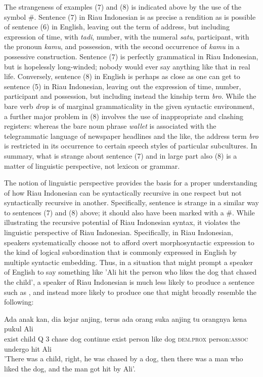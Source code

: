 \documentclass[output=paper,colorlinks,citecolor=brown
]{langscibook}
\begin{document}
The strangeness of examples (7) and (8) is indicated above by the use of the symbol \#.  Sentence (7) in Riau Indonesian is as precise a rendition as is possible of sentence (6) in English, leaving out the term of address, but including expression of time, with \emph{tadi}, number, with the numeral \emph{satu}, participant, with the pronoun \emph{kamu}, and possession, with the second occurrence of \emph{kamu} in a possessive construction.  Sentence (7) is perfectly grammatical in Riau Indonesian, but is hopelessly long-winded; nobody would ever say anything like that in real life.  Conversely, sentence (8) in English is perhaps as close as one can get to sentence (5) in Riau Indonesian, leaving out the expression of time, number, participant and possession, but including instead the kinship term \emph{bro}.  While the bare verb \emph{drop} is of marginal grammaticality in the given syntactic environment, a further major problem in (8) involves the use of inappropriate and clashing registers: whereas the bare noun phrase \emph{wallet} is associated with the telegrammatic language of newspaper headlines and the like, the address term \emph{bro} is restricted in its occurrence to certain speech styles of particular subcultures.  In summary, what is strange about sentence (7) and in large part also (8) is a matter of linguistic perspective, not lexicon or grammar.

The notion of linguistic perspective provides the basis for a proper understanding of how Riau Indonesian can be syntactically recursive in one respect but not syntactically recursive in another.  Specifically, sentence  is strange in a similar way to sentences (7) and (8) above; it should also have been marked with a \#.  While illustrating the recursive potential of Riau Indonesian syntax, it violates the linguistic perspective of Riau Indonesian.  Specifically, in Riau Indonesian, speakers systematically choose not to afford overt morphosyntactic expression to the kind of logical subordination that is commonly expressed in English by multiple syntactic embedding.  Thus, in a situation that might prompt a speaker of English to say something like 'Ali hit the person who likes the dog that chased the child', a speaker of Riau Indonesian is much less likely to produce a sentence such as , and instead more likely to produce one that might broadly resemble the following:

\ea
\gll Ada	anak	kan,	dia	kejar	anjing,	terus	ada	orang	suka	anjing	tu orangnya	kena	pukul	Ali \\
    exist	child	Q	3	chase	dog	continue	exist	person	like	dog \textsc{dem.prox} person:\textsc{assoc}	undergo	hit	Ali\\
\glt 		'There was a child, right, he was chased by a dog, then there was a man who liked the dog, and the man got hit by Ali'.
\z
\end{document}

